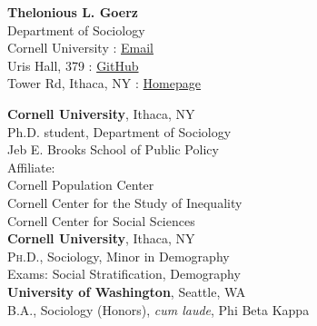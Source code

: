 \documentclass[11pt]{article} %
\begin{document}
{\Large \textbf{Thelonious L. Goerz}} \\


Department of Sociology \\
Cornell University \hfill {} : \href{mailto:theloniouslgoerz@gmail.com}{Email}\\ %
Uris Hall, 379  \hfill {} : \href{https://github.com/theloniousgoerz/}{GitHub}\\ %
Tower Rd, Ithaca, NY \hfill {} : \href{theloniousgoerz.github.io}{Homepage} \\

\vspace{0.001\textheight} %




 \textbf{Cornell University}, Ithaca, NY \\
Ph.D. student, Department of Sociology \\ 
Jeb E. Brooks School of Public Policy  \\
Affiliate: \\
\hspace*{10mm} Cornell Population Center 
\\ \hspace*{10mm} Cornell Center for the Study of Inequality \\
\hspace*{10mm} Cornell Center for Social Sciences \\

  \textbf{Cornell University}, Ithaca, NY \\
 \textsc{Ph.D.}, Sociology, Minor in Demography \\
\hspace*{10mm} Exams: Social Stratification, Demography\\
 
 \textbf{University of Washington}, Seattle, WA\\
\textsc{B.A.}, Sociology (Honors), \emph{cum laude}, Phi Beta Kappa \\
\end{document}
